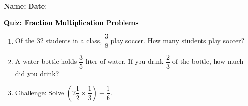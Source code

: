 \documentclass[12pt, letterpaper, fleqn]{article}
\begin{document}
\textbf{Name:} \underline{\hspace{5cm}}
\hfill
\textbf{Date:} \underline{\hspace{3cm}}\\

\begin{tcolorbox}[colback=customteal!20]
    \large\textcolor{black}{\textbf{Quiz: Fraction Multiplication Problems}}
\end{tcolorbox}
\begin{enumerate}[itemsep=3.5cm, leftmargin=0.6cm]
\item Of the 32 students in a class, $\dfrac{3}{8}$ play soccer. How many students play soccer?
\vspace{3.5cm}
\item A water bottle holds $\dfrac{3}{5}$ liter of water. If you drink $\dfrac{2}{3}$ of the bottle, how much did you drink?
\vspace{3.5cm}
\item Challenge: Solve $\left(2\dfrac{1}{2} \times \dfrac{1}{3}\right) + \dfrac{1}{6}$.
\end{enumerate}
\end{document}
